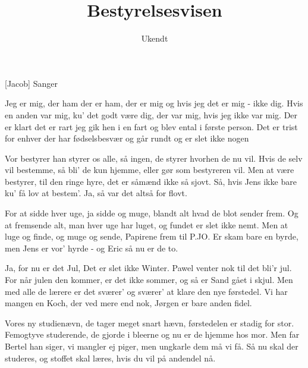 \documentclass[a4paper,11pt]{article}
\title{Bestyrelsesvisen}
\author{Ukendt}
\begin{document}
\maketitle

\begin{roles}
[Jacob] Sanger 
\end{roles}

\begin{song}
     Jeg er mig, der ham
              der er ham, der er mig
              og hvis jeg det er mig - ikke dig.
              Hvis en anden var mig,
              ku' det godt være dig,
              der var mig, hvis jeg ikke var mig.
              Der er klart det er rart
              jeg gik hen i en fart
              og blev ental i første person.
              Det er trist for enhver
              der har fødselsbesvær
              og går rundt og er slet ikke nogen

     Vor bestyrer han styrer
              os alle, så ingen,
              de styrer hvorhen de nu vil.
              Hvis de selv vil bestemme,
              så bli' de kun hjemme,
              eller gør som bestyreren vil.
              Men at være bestyrer,
              til den ringe hyre,
              det er såmænd ikke så sjovt.
              Så, hvis Jens ikke bare
              ku' få lov at bestem'.
              Ja, så var det altså for flovt.

     For at sidde hver uge,
              ja sidde og muge,
              blandt alt hvad de blot sender frem.
              Og at fremsende alt,
              man hver uge har luget,
              og fundet er slet ikke nemt.
              Men at luge og finde,
              og muge og sende,
              Papirene frem til P.JO.
              Er skam bare en byrde,
              men Jens er vor' hyrde
              - og Eric så nu er de to.

     Ja, for nu er det Jul,
              Det er slet ikke Winter.
              Pawel venter nok til det bli'r jul.
              For når julen den kommer,
              er det ikke sommer,
              og så er Sand gået i skjul.
              Men med alle de lærere
              er det sværer' og sværer'
              at klare den nye førstedel.
              Vi har mangen en Koch,
              der ved mere end nok,
              Jørgen er bare anden fidel.

     Vores ny studienævn,
              de tager meget snart hævn,
              førstedelen er stadig for stor.
              Femogtyve studerende,
              de gjorde i bleerne
              og nu er de hjemme hos mor.
              Men far Bertel han siger,
              vi mangler ej piger,
              men ungkarle dem må vi få.
              Så nu skal der studeres,
              og stoffet skal læres,
              hvis du vil på andendel nå.

\end{song}
\end{document}
